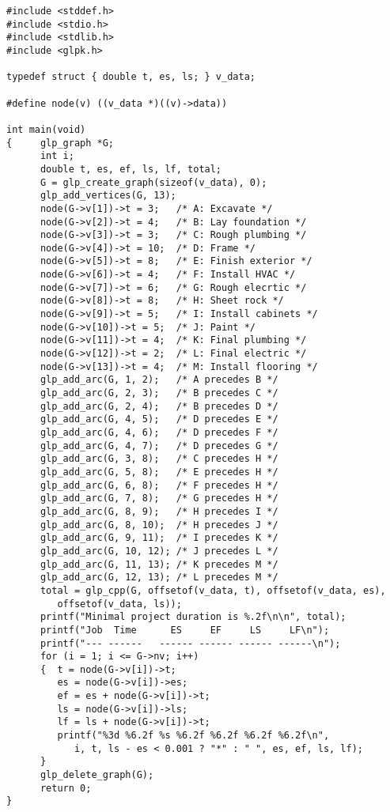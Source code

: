 \documentclass[dvipdfm,11pt]{report}
\begin{document}
\begin{footnotesize}
\begin{verbatim}
#include <stddef.h>
#include <stdio.h>
#include <stdlib.h>
#include <glpk.h>

typedef struct { double t, es, ls; } v_data;

#define node(v) ((v_data *)((v)->data))

int main(void)
{     glp_graph *G;
      int i;
      double t, es, ef, ls, lf, total;
      G = glp_create_graph(sizeof(v_data), 0);
      glp_add_vertices(G, 13);
      node(G->v[1])->t = 3;   /* A: Excavate */
      node(G->v[2])->t = 4;   /* B: Lay foundation */
      node(G->v[3])->t = 3;   /* C: Rough plumbing */
      node(G->v[4])->t = 10;  /* D: Frame */
      node(G->v[5])->t = 8;   /* E: Finish exterior */
      node(G->v[6])->t = 4;   /* F: Install HVAC */
      node(G->v[7])->t = 6;   /* G: Rough elecrtic */
      node(G->v[8])->t = 8;   /* H: Sheet rock */
      node(G->v[9])->t = 5;   /* I: Install cabinets */
      node(G->v[10])->t = 5;  /* J: Paint */
      node(G->v[11])->t = 4;  /* K: Final plumbing */
      node(G->v[12])->t = 2;  /* L: Final electric */
      node(G->v[13])->t = 4;  /* M: Install flooring */
      glp_add_arc(G, 1, 2);   /* A precedes B */
      glp_add_arc(G, 2, 3);   /* B precedes C */
      glp_add_arc(G, 2, 4);   /* B precedes D */
      glp_add_arc(G, 4, 5);   /* D precedes E */
      glp_add_arc(G, 4, 6);   /* D precedes F */
      glp_add_arc(G, 4, 7);   /* D precedes G */
      glp_add_arc(G, 3, 8);   /* C precedes H */
      glp_add_arc(G, 5, 8);   /* E precedes H */
      glp_add_arc(G, 6, 8);   /* F precedes H */
      glp_add_arc(G, 7, 8);   /* G precedes H */
      glp_add_arc(G, 8, 9);   /* H precedes I */
      glp_add_arc(G, 8, 10);  /* H precedes J */
      glp_add_arc(G, 9, 11);  /* I precedes K */
      glp_add_arc(G, 10, 12); /* J precedes L */
      glp_add_arc(G, 11, 13); /* K precedes M */
      glp_add_arc(G, 12, 13); /* L precedes M */
      total = glp_cpp(G, offsetof(v_data, t), offsetof(v_data, es),
         offsetof(v_data, ls));
      printf("Minimal project duration is %.2f\n\n", total);
      printf("Job  Time      ES     EF     LS     LF\n");
      printf("--- ------   ------ ------ ------ ------\n");
      for (i = 1; i <= G->nv; i++)
      {  t = node(G->v[i])->t;
         es = node(G->v[i])->es;
         ef = es + node(G->v[i])->t;
         ls = node(G->v[i])->ls;
         lf = ls + node(G->v[i])->t;
         printf("%3d %6.2f %s %6.2f %6.2f %6.2f %6.2f\n",
            i, t, ls - es < 0.001 ? "*" : " ", es, ef, ls, lf);
      }
      glp_delete_graph(G);
      return 0;
}
\end{verbatim}
\end{footnotesize}
\end{document}
